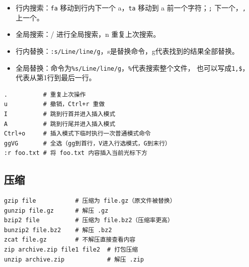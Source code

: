 \begin{itemize}
	\item 行内搜索：\verb|fa| 移动到行内下一个 a，\verb|ta| 移动到 a 前一个字符；\verb|;| 下一个，\verb|,| 上一个。
	\item 全局搜索：/ 进行全局搜索，n 重复上次搜索。
	\item 行内替换：\verb|:s/Line/line/g|，s是替换命令，g代表找到的结果全部替换。
	\item 全局替换：命令为\verb|%s/Line/line/g|，\verb|%|代表搜索整个文件，
	      也可以写成\verb|1,$|，代表从第1行到最后一行。
\end{itemize}

\begin{code}[title=vim 其他常用命令]
	\begin{verbatim}
.          # 重复上次操作
u          # 撤销，Ctrl+r 重做
I          # 跳到行首并进入插入模式
A          # 跳到行尾并进入插入模式
Ctrl+o     # 插入模式下临时执行一次普通模式命令
ggVG       # 全选（gg到首行，V进入行选模式，G到末行）
:r foo.txt # 将 foo.txt 内容插入当前光标下方
	\end{verbatim}
\end{code}

\subsection{压缩}
\begin{code}[title=压缩与归档]
	\begin{verbatim}
gzip file           # 压缩为 file.gz（原文件被替换）
gunzip file.gz      # 解压 .gz
bzip2 file          # 压缩为 file.bz2（压缩率更高）
bunzip2 file.bz2    # 解压 .bz2
zcat file.gz        # 不解压直接查看内容
zip archive.zip file1 file2  # 打包压缩
unzip archive.zip            # 解压 .zip
	\end{verbatim}
\end{code}
